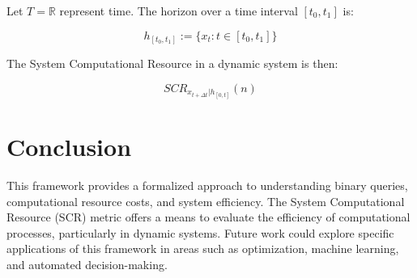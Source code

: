 \documentclass[11pt,a4paper]{article}
\theoremstyle{definition}
\theoremstyle{remark}
\numberwithin{equation}{section}
\begin{document}
Let $T = \mathbb{R}$ represent time. The horizon over a time interval $[t_0, t_1]$ is:

\[
h_{[t_0, t_1]} := \{ x_t : t \in [t_0, t_1] \}
\]

The System Computational Resource in a dynamic system is then:

\[
SCR_{x_{t+\Delta t} | h_{[0,t]}}(n)
\]

\section{Conclusion}

This framework provides a formalized approach to understanding binary queries, computational resource costs, and system efficiency. The System Computational Resource (SCR) metric offers a means to evaluate the efficiency of computational processes, particularly in dynamic systems. Future work could explore specific applications of this framework in areas such as optimization, machine learning, and automated decision-making.



\end{document}
